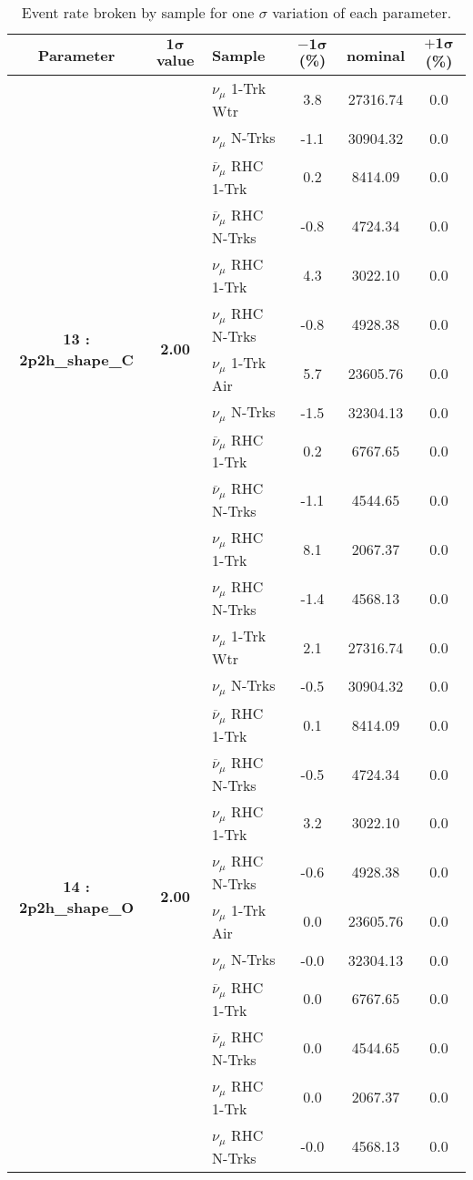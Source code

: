 \addtocounter{table}{-1}
\begin{table}[ht!]
\centering
\begin{tabular}{ c  c  l  c  c  c }
\midrule[1.3pt]
\textbf{Parameter} & \textbf{$\mathbf{1\sigma}$ value} & \textbf{Sample} & \textbf{$\mathbf{-1\sigma}$ (\%)}  &  \textbf{nominal}  &  \textbf{$\mathbf{+1\sigma}$ (\%)} \\
\midrule[1.3pt]
\multirow{12}{*}{\textbf{13 : 2p2h\_shape\_C}} & \multirow{12}{*}{\textbf{2.00}} & $\nu_\mu$ 1-Trk Wtr &   3.8 &  27316.74 &   0.0 \\ 
 &  & $\nu_\mu$ N-Trks &   -1.1 &  30904.32 &   0.0 \\ 
 &  & $\overline{\nu}_\mu$ RHC 1-Trk &   0.2 &  8414.09 &   0.0 \\ 
 &  & $\overline{\nu}_\mu$ RHC N-Trks &   -0.8 &  4724.34 &   0.0 \\ 
 &  & $\nu_\mu$ RHC 1-Trk &   4.3 &  3022.10 &   0.0 \\ 
 &  & $\nu_\mu$ RHC N-Trks &   -0.8 &  4928.38 &   0.0 \\ 
 &  & $\nu_\mu$ 1-Trk Air &   5.7 &  23605.76 &   0.0 \\ 
 &  & $\nu_\mu$ N-Trks &   -1.5 &  32304.13 &   0.0 \\ 
 &  & $\overline{\nu}_\mu$ RHC 1-Trk &   0.2 &  6767.65 &   0.0 \\ 
 &  & $\overline{\nu}_\mu$ RHC N-Trks &   -1.1 &  4544.65 &   0.0 \\ 
 &  & $\nu_\mu$ RHC 1-Trk &   8.1 &  2067.37 &   0.0 \\ 
 &  & $\nu_\mu$ RHC N-Trks &   -1.4 &  4568.13 &   0.0 \\ 
\midrule[1.3pt]
\multirow{12}{*}{\textbf{14 : 2p2h\_shape\_O}} & \multirow{12}{*}{\textbf{2.00}} & $\nu_\mu$ 1-Trk Wtr &   2.1 &  27316.74 &   0.0 \\ 
 &  & $\nu_\mu$ N-Trks &   -0.5 &  30904.32 &   0.0 \\ 
 &  & $\overline{\nu}_\mu$ RHC 1-Trk &   0.1 &  8414.09 &   0.0 \\ 
 &  & $\overline{\nu}_\mu$ RHC N-Trks &   -0.5 &  4724.34 &   0.0 \\ 
 &  & $\nu_\mu$ RHC 1-Trk &   3.2 &  3022.10 &   0.0 \\ 
 &  & $\nu_\mu$ RHC N-Trks &   -0.6 &  4928.38 &   0.0 \\ 
 &  & $\nu_\mu$ 1-Trk Air &   0.0 &  23605.76 &   0.0 \\ 
 &  & $\nu_\mu$ N-Trks &   -0.0 &  32304.13 &   0.0 \\ 
 &  & $\overline{\nu}_\mu$ RHC 1-Trk &   0.0 &  6767.65 &   0.0 \\ 
 &  & $\overline{\nu}_\mu$ RHC N-Trks &   0.0 &  4544.65 &   0.0 \\ 
 &  & $\nu_\mu$ RHC 1-Trk &   0.0 &  2067.37 &   0.0 \\ 
 &  & $\nu_\mu$ RHC N-Trks &   -0.0 &  4568.13 &   0.0 \\ 
\midrule[1.3pt]
\end{tabular}
\centering
\caption{Event rate broken by sample for one $\sigma$ variation of each parameter.}
\end{table}
